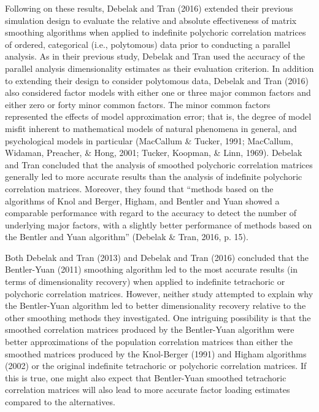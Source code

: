 \documentclass[
  english,
  man]{apa6}
\begin{document}
Following on these results, Debelak and Tran (2016) extended their previous simulation design to evaluate the relative and absolute effectiveness of matrix smoothing algorithms when applied to indefinite polychoric correlation matrices of ordered, categorical (i.e., polytomous) data prior to conducting a parallel analysis. As in their previous study, Debelak and Tran used the accuracy of the parallel analysis dimensionality estimates as their evaluation criterion. In addition to extending their design to consider polytomous data, Debelak and Tran (2016) also considered factor models with either one or three major common factors and either zero or forty minor common factors. The minor common factors represented the effects of model approximation error; that is, the degree of model misfit inherent to mathematical models of natural phenomena in general, and psychological models in particular (MacCallum \& Tucker, 1991; MacCallum, Widaman, Preacher, \& Hong, 2001; Tucker, Koopman, \& Linn, 1969). Debelak and Tran concluded that the analysis of smoothed polychoric correlation matrices generally led to more accurate results than the analysis of indefinite polychoric correlation matrices. Moreover, they found that \enquote{methods based on the algorithms of Knol and Berger, Higham, and Bentler and Yuan showed a comparable performance with regard to the accuracy to detect the number of underlying major factors, with a slightly better performance of methods based on the Bentler and Yuan algorithm} (Debelak \& Tran, 2016, p. 15).

Both Debelak and Tran (2013) and Debelak and Tran (2016) concluded that the Bentler-Yuan (2011) smoothing algorithm led to the most accurate results (in terms of dimensionality recovery) when applied to indefinite tetrachoric or polychoric correlation matrices. However, neither study attempted to explain why the Bentler-Yuan algorithm led to better dimensionality recovery relative to the other smoothing methods they investigated. One intriguing possibility is that the smoothed correlation matrices produced by the Bentler-Yuan algorithm were better approximations of the population correlation matrices than either the smoothed matrices produced by the Knol-Berger (1991) and Higham algorithms (2002) or the original indefinite tetrachoric or polychoric correlation matrices. If this is true, one might also expect that Bentler-Yuan smoothed tetrachoric correlation matrices will also lead to more accurate factor loading estimates compared to the alternatives.
\end{document}
